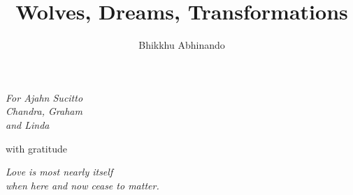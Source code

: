 \documentclass[11pt,twoside,final]{memoir}
\title{Wolves, Dreams, Transformations}
\subtitle{}
\author{Bhikkhu Abhinando}
\date{}
\begin{document}
\emptysheet


\frontmatter*


%


\cleartorecto
\thispagestyle{empty}



\cleartoverso
\thispagestyle{empty}



\cleartorecto
\thispagestyle{empty}
{\raggedleft\vspace*{3em}\par

\begin{minipage}{5cm}
\itshape
For Ajahn Sucitto\\
Chandra, Graham\\
and Linda

with gratitude
\end{minipage}

\par}

\cleartorecto
\thispagestyle{empty}
{\raggedleft\vspace*{3em}\par

\begin{minipage}{5cm}
\itshape
Love is most nearly itself\\
when here and now cease to matter.\\
\end{minipage}

\par}


\cleartoverso
\tableofcontents*


\mainmatter*
\end{document}

